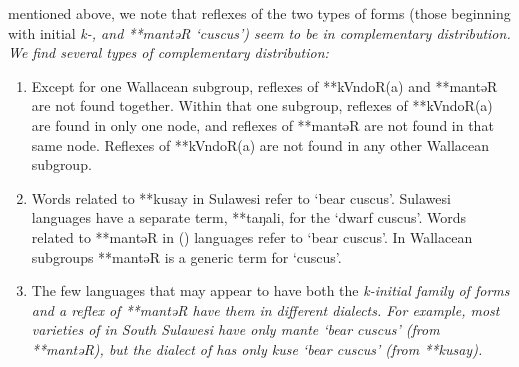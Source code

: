  mentioned above, we note that reflexes of the two types of
forms (those beginning with initial \it{k-},
and **mantəR ‘cuscus’) seem to be in complementary distribution.
We find several types of complementary distribution:

\begin{enumerate}
	\item	Except for one Wallacean subgroup,
				reflexes of **kVndoR(a) and **mantəR are not found together.
				Within that one subgroup,
				reflexes of **kVndoR(a) are found in only one node,
				and reflexes of **mantəR are not found in that same node.
				Reflexes of **kVndoR(a) are not found in any other Wallacean subgroup.
	\item	Words related to **kusay in Sulawesi refer to ‘bear cuscus’.
				Sulawesi languages have a separate term,
				**taŋali, for the ‘dwarf cuscus’.
				Words related to **mantəR in  () languages
				refer to ‘bear cuscus’.
				In Wallacean subgroups **mantəR is a generic term for ‘cuscus’.
	\item	The few languages that may appear to have both the \it{k}-initial
				family of forms and a reflex of **mantəR have them in different dialects.
				For example, most varieties of  in South Sulawesi
				have only \it{mante} ‘bear cuscus’ (from **mantəR),
				but the  dialect of  has only \it{kuse} ‘bear cuscus’ (from **kusay).
\end{enumerate}